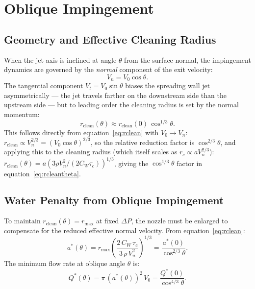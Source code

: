 \documentclass[aps,prfluids,reprint,amsmath,amssymb,floatfix]{revtex4-2}
\begin{document}
\section{Oblique Impingement}
\label{sec:oblique}

\subsection{Geometry and Effective Cleaning Radius}
\label{subsec:oblique_geom}

When the jet axis is inclined at angle $\theta$ from the surface normal,
the impingement dynamics are governed by the \emph{normal} component of
the exit velocity:
\begin{equation}
  V_n = V_0\cos\theta.
  \label{eq:Vn}
\end{equation}
The tangential component $V_t = V_0\sin\theta$ biases the spreading wall
jet asymmetrically --- the jet travels farther on the downstream side than
the upstream side \citep{BeitelmalEtAl2000} --- but to leading order the
cleaning radius is set by the normal momentum:
\begin{equation}
  r_\mathrm{clean}(\theta) \approx r_\mathrm{clean}(0)\,\cos^{1/3}\theta.
  \label{eq:rcleantheta}
\end{equation}
This follows directly from equation~\eqref{eq:rclean} with $V_0 \to V_n$:
$r_\mathrm{clean} \propto V_n^{2/3} = (V_0\cos\theta)^{2/3}$, so the
relative reduction factor is $\cos^{2/3}\theta$, and applying this
to the cleaning radius (which itself scales as $r_c \propto a V_n^{2/3}$):
$r_\mathrm{clean}(\theta) = a(3\rho V_n^2/(2C_W\tau_c))^{1/3}$, giving
the $\cos^{1/3}\theta$ factor in equation~\eqref{eq:rcleantheta}.

\subsection{Water Penalty from Oblique Impingement}
\label{subsec:oblique_penalty}

To maintain $r_\mathrm{clean}(\theta) = r_\mathrm{max}$ at fixed $\Delta P$,
the nozzle must be enlarged to compensate for the reduced effective normal
velocity. From equation~\eqref{eq:rclean}:
\begin{equation}
  a^*(\theta) = r_\mathrm{max}
  \left(\frac{2\,C_W\,\tau_c}{3\,\rho\,V_n^2}\right)^{1/3}
  = \frac{a^*(0)}{\cos^{2/3}\theta}.
  \label{eq:atheta}
\end{equation}
The minimum flow rate at oblique angle $\theta$ is:
\begin{equation}
  Q^*(\theta) = \pi\,(a^*(\theta))^2\,V_0
  = \frac{Q^*(0)}{\cos^{4/3}\theta}.
  \label{eq:Qtheta}
\end{equation}
\end{document}
